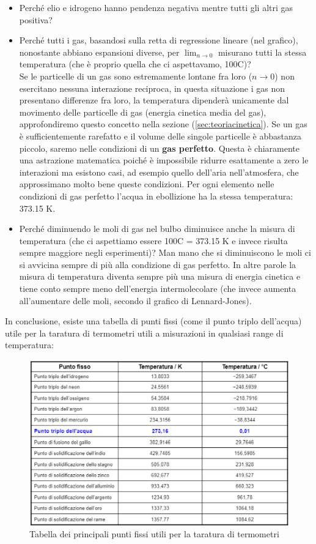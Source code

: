 \documentclass[10pt,a4paper]{article}
\begin{document}
\begin{itemize}
 \item Perché elio e idrogeno hanno pendenza negativa mentre tutti gli altri gas positiva?\\
 
 \item Perché tutti i gas, basandosi sulla retta di regressione lineare (nel grafico), nonostante abbiano espansioni diverse, per $\lim_{n \to 0}$ misurano tutti la stessa temperatura (che è proprio quella che ci aspettavamo, 100\textdegree C)? \\
   Se le particelle di un gas sono estremamente lontane fra loro ($n \to 0$) non esercitano nessuna interazione reciproca, in questa situazione i gas non presentano differenze fra loro, la temperatura dipenderà unicamente dal movimento delle particelle di gas (energia cinetica media del gas), approfondiremo questo concetto nella sezione (\ref{sec:teoriacinetica}). Se un gas è sufficientemente rarefatto e il volume delle singole particelle è abbastanza piccolo, saremo nelle condizioni di un \textbf{gas perfetto}. Questa è chiaramente una astrazione matematica poiché è impossibile ridurre esattamente a zero le interazioni ma esistono casi, ad esempio quello dell'aria nell'atmosfera, che approssimano molto bene queste condizioni. Per ogni elemento nelle condizioni di gas perfetto l'acqua in ebollizione ha la stessa temperatura: 373.15 \textdegree K.
  \item Perché diminuendo le moli di gas nel bulbo diminuisce anche la misura di temperatura (che ci aspettiamo essere 100\textdegree C = 373.15 \textdegree K e invece risulta sempre maggiore negli esperimenti)? 
   Man mano che si diminuiscono le moli ci si avvicina sempre di più alla condizione di gas perfetto. In altre parole la misura di temperatura diventa sempre più una misura di energia cinetica e tiene conto sempre meno dell'energia intermolecolare (che invece aumenta all'aumentare delle moli, secondo il grafico di Lennard-Jones).
\end{itemize}
In conclusione, esiste una tabella di punti fissi (come il punto triplo dell'acqua) utile per la taratura di termometri utili a misurazioni in qualsiasi range di temperatura:
\begin{figure}[h!]
	\centering
	\includegraphics[width=0.7\linewidth]{../images/Punti_fissi}
	\caption{Tabella dei principali punti fissi utili per la taratura di termometri}
	\label{fig:puntifissi}
\end{figure}
\end{document}
